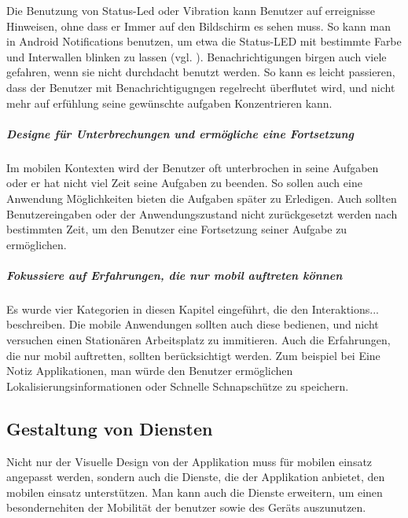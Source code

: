 Die Benutzung von Status-Led oder Vibration kann Benutzer auf erreignisse Hinweisen, ohne dass er Immer auf den Bildschirm es sehen muss. So kann man in Android Notifications benutzen, um etwa die Status-LED mit bestimmte Farbe und Interwallen blinken zu lassen (vgl. \cite{androidNotApi}). Benachrichtigungen birgen auch viele gefahren, wenn sie nicht durchdacht benutzt werden. So kann es leicht passieren, dass der Benutzer mit Benachrichtigugngen regelrecht überflutet wird, und nicht mehr auf erfühlung seine gewünschte aufgaben Konzentrieren kann.  

\subparagraph{Designe für Unterbrechungen und ermögliche eine Fortsetzung}
\label{subp:erm_gliche_eine_fortsetzung}

Im mobilen Kontexten wird der Benutzer oft unterbrochen in seine Aufgaben oder er hat nicht viel Zeit seine Aufgaben zu beenden. So sollen auch eine Anwendung Möglichkeiten bieten die Aufgaben später zu Erledigen. Auch sollten Benutzereingaben oder der Anwendungszustand nicht zurückgesetzt werden nach bestimmten Zeit, um den Benutzer eine Fortsetzung seiner Aufgabe zu ermöglichen.



\subparagraph{Fokussiere auf Erfahrungen, die nur mobil auftreten können} %
\label{subp:fokussiere_auf_erfahrungen_die_nur_mobil_auftreten_k_nnen}

Es wurde vier Kategorien in diesen Kapitel eingeführt, die den Interaktions... beschreiben. Die mobile Anwendungen sollten auch diese bedienen, und nicht versuchen einen Stationären Arbeitsplatz zu immitieren. Auch die Erfahrungen, die nur mobil auftretten, sollten berücksichtigt werden. Zum beispiel bei Eine Notiz Applikationen, man würde den Benutzer ermöglichen Lokalisierungsinformationen oder Schnelle Schnapschütze zu speichern. 


\subsection{Gestaltung von Diensten}
\label{sub:gestaltung_von_diensten}

Nicht nur der Visuelle Design von der Applikation muss für mobilen einsatz angepasst werden, sondern auch die Dienste, die der Applikation anbietet, den mobilen einsatz unterstützen. Man kann auch die Dienste erweitern, um einen besondernehiten der Mobilität der benutzer sowie des Geräts auszunutzen.

